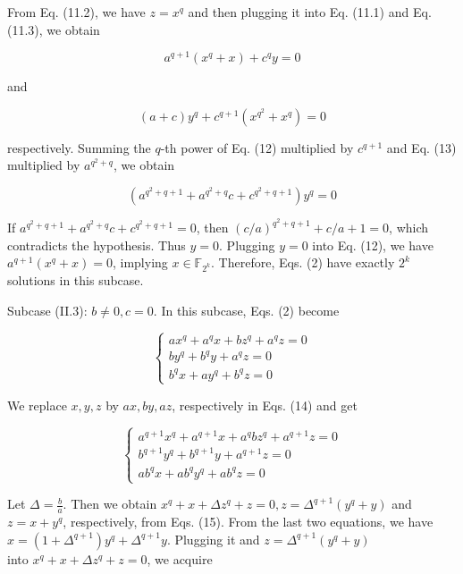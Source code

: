 \documentclass[10pt]{article}
\begin{document}
From Eq. (11.2), we have $z=x^{q}$ and then plugging it into Eq. (11.1) and Eq. (11.3), we obtain


\begin{equation*}
a^{q+1}\left(x^{q}+x\right)+c^{q} y=0 \tag{12}
\end{equation*}


and


\begin{equation*}
(a+c) y^{q}+c^{q+1}\left(x^{q^{2}}+x^{q}\right)=0 \tag{13}
\end{equation*}


respectively. Summing the $q$-th power of Eq. (12) multiplied by $c^{q+1}$ and Eq. (13) multiplied by $a^{q^{2}+q}$, we obtain

$$
\left(a^{q^{2}+q+1}+a^{q^{2}+q} c+c^{q^{2}+q+1}\right) y^{q}=0
$$

If $a^{q^{2}+q+1}+a^{q^{2}+q} c+c^{q^{2}+q+1}=0$, then $(c / a)^{q^{2}+q+1}+c / a+1=0$, which contradicts the hypothesis. Thus $y=0$. Plugging $y=0$ into Eq. (12), we have $a^{q+1}\left(x^{q}+x\right)=0$, implying $x \in \mathbb{F}_{2^{k}}$. Therefore, Eqs. (2) have exactly $2^{k}$ solutions in this subcase.

Subcase (II.3): $b \neq 0, c=0$. In this subcase, Eqs. (2) become

\[
\left\{\begin{array}{l}
a x^{q}+a^{q} x+b z^{q}+a^{q} z=0  \tag{14.1}\\
b y^{q}+b^{q} y+a^{q} z=0 \\
b^{q} x+a y^{q}+b^{q} z=0
\end{array}\right.
\]

We replace $x, y, z$ by $a x, b y, a z$, respectively in Eqs. (14) and get

\[
\left\{\begin{array}{l}
a^{q+1} x^{q}+a^{q+1} x+a^{q} b z^{q}+a^{q+1} z=0  \tag{15.1}\\
b^{q+1} y^{q}+b^{q+1} y+a^{q+1} z=0 \\
a b^{q} x+a b^{q} y^{q}+a b^{q} z=0
\end{array}\right.
\]

Let $\Delta=\frac{b}{a}$. Then we obtain $x^{q}+x+\Delta z^{q}+z=0, z=\Delta^{q+1}\left(y^{q}+y\right)$ and $z=x+y^{q}$, respectively, from Eqs. (15). From the last two equations, we have $x=\left(1+\Delta^{q+1}\right) y^{q}+\Delta^{q+1} y$. Plugging it and $z=\Delta^{q+1}\left(y^{q}+y\right)$\\
into $x^{q}+x+\Delta z^{q}+z=0$, we acquire
\end{document}
